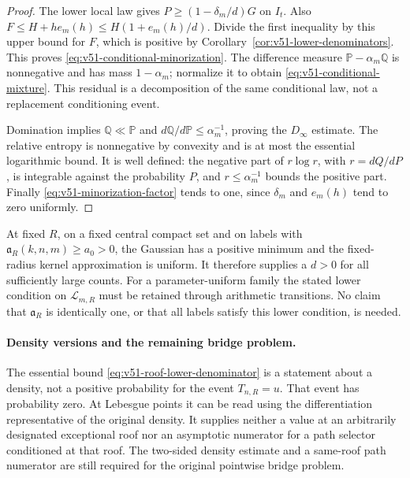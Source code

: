 \begin{proof}
The lower local law gives $P\ge(1-\delta_m/d)G$ on $I_t$.
Also $F\le H+he_m(h)\le H(1+e_m(h)/d)$. Divide the first
inequality by this upper bound for $F$, which is positive by
Corollary~\ref{cor:v51-lower-denominators}. This proves
\eqref{eq:v51-conditional-minorization}. The difference measure
$\mathbb P-\alpha_m\mathbb Q$ is nonnegative and has mass
$1-\alpha_m$; normalize it to obtain
\eqref{eq:v51-conditional-mixture}. This residual is a decomposition
of the same conditional law, not a replacement conditioning event.

Domination implies $\mathbb Q\ll\mathbb P$ and
$d\mathbb Q/d\mathbb P\le\alpha_m^{-1}$, proving the
$D_\infty$ estimate. The relative entropy is nonnegative by convexity
and is at most the essential logarithmic bound. It is well defined:
the negative part of $r\log r$, with $r=dQ/dP$, is integrable
against the probability $P$, and $r\le\alpha_m^{-1}$ bounds the
positive part. Finally \eqref{eq:v51-minorization-factor} tends
to one, since $\delta_m$ and $e_m(h)$ tend to zero uniformly.
\end{proof}

\begin{remark}
\label{rem:v51-arithmetic-positivity}
At fixed $R$, on a fixed central compact set and on labels with
$\mathfrak a_R(k,n,m)\ge a_0>0$, the Gaussian has a positive
minimum and the fixed-radius kernel approximation is uniform.
It therefore supplies a $d>0$ for all sufficiently large counts.
For a parameter-uniform family the stated lower condition on
$\mathcal L_{m,R}$ must be retained through arithmetic transitions.
No claim that $\mathfrak a_R$ is identically one, or that all labels
satisfy this lower condition, is needed.
\end{remark}

\paragraph{Density versions and the remaining bridge problem.}
The essential bound \eqref{eq:v51-roof-lower-denominator} is a
statement about a density, not a positive probability for the event
$T_{n,R}=u$. That event has probability zero. At Lebesgue points it
can be read using the differentiation representative of the original
density. It supplies neither a value at an arbitrarily designated
exceptional roof nor an asymptotic numerator for a path selector
conditioned at that roof. The two-sided density estimate and a
same-roof path numerator are still required for the original
pointwise bridge problem.

